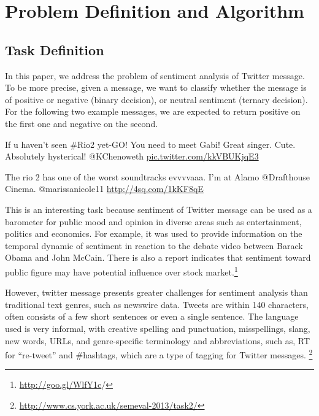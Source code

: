 \section{Problem Definition and Algorithm}
\label{sec:def}

\subsection{Task Definition}
In this paper, we address the problem of sentiment analysis of Twitter message. To be more precise, 
given a message, we want to classify whether the message is of positive or negative (binary decision), or neutral sentiment (ternary decision). For the following two example messages, we are expected to return positive on the first one and negative on the second. 
\begin{mdframed}[
  leftmargin=\parindent,
  rightmargin=\parindent,
  skipabove=\topsep,
  skipbelow=\topsep
  ]
  If u haven't seen \#Rio2 yet-GO! You need to meet Gabi! Great singer. Cute. Absolutely hysterical! @KChenoweth \url{pic.twitter.com/kkVBUKjqE3}
\end{mdframed}
\vspace{-2mm}
\begin{mdframed}[
  leftmargin=\parindent,
  rightmargin=\parindent,
  skipabove=\topsep,
  skipbelow=\topsep
  ]
 The rio 2 has one of the worst soundtracks evvvvaaa. I'm at Alamo @Drafthouse Cinema. @marissanicole11 \url{http://4sq.com/1kKF8qE} 
\end{mdframed}

This is an interesting task because sentiment of Twitter message can be used as a barometer for public mood and opinion in diverse areas such as entertainment, politics and economics. For example, 
it was used to provide information on the temporal dynamic of sentiment in reaction to the debate video between Barack Obama and John McCain\cite{Diakopoulos:2010}. 
There is also a report indicates that sentiment toward public figure may have potential influence over stock market.\footnote{\url{http://goo.gl/WlfY1c}/} 

However, twitter message presents greater challenges for sentiment analysis than traditional text genres, such as newswire data.  Tweets are within 140 characters, often consists of a few short sentences or even a single sentence. 
The language used is very informal, with creative spelling and punctuation, misspellings, slang, new words, URLs, and genre-specific terminology and abbreviations, such as, RT for “re-tweet” and \#hashtags, which are a type of tagging for Twitter messages. \footnote{\url{http://www.cs.york.ac.uk/semeval-2013/task2/}}


